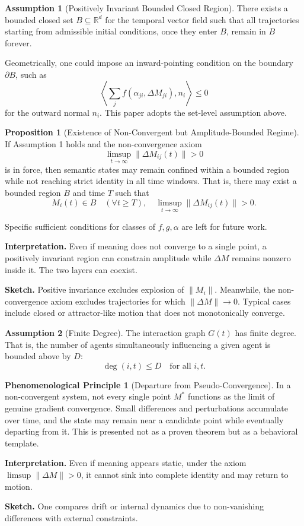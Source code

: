 \documentclass[11pt,a4paper]{article}
\theoremstyle{definition}
\newtheorem{proposition}{Proposition}[section]
\newtheorem{assumption}{Assumption}[section]
\newtheorem{phenomenological}{Phenomenological Principle}[section]
\begin{document}
\begin{assumption}[Positively Invariant Bounded Closed Region]
There exists a bounded closed set $B \subseteq \mathbb{R}^d$ for the temporal vector field such that all trajectories starting from admissible initial conditions, once they enter $B$, remain in $B$ forever.

Geometrically, one could impose an inward-pointing condition on the boundary $\partial B$, such as
\[
\left\langle \sum_j f(\alpha_{ji}, \Delta M_{ji}), n_i \right\rangle \leq 0
\]
for the outward normal $n_i$. This paper adopts the set-level assumption above.
\end{assumption}

\begin{proposition}[Existence of Non-Convergent but Amplitude-Bounded Regime]
If Assumption 1 holds and the non-convergence axiom
\[
\limsup_{t \to \infty} \|\Delta M_{ij}(t)\| > 0
\]
is in force, then semantic states may remain confined within a bounded region while not reaching strict identity in all time windows. That is, there may exist a bounded region $B$ and time $T$ such that
\[
M_i(t) \in B \quad (\forall t \geq T), \quad \limsup_{t \to \infty} \|\Delta M_{ij}(t)\| > 0.
\]

Specific sufficient conditions for classes of $f, g, \alpha$ are left for future work.
\end{proposition}

\textbf{Interpretation.} Even if meaning does not converge to a single point, a positively invariant region can constrain amplitude while $\Delta M$ remains nonzero inside it. The two layers can coexist.

\textbf{Sketch.} Positive invariance excludes explosion of $\|M_i\|$. Meanwhile, the non-convergence axiom excludes trajectories for which $\|\Delta M\| \to 0$. Typical cases include closed or attractor-like motion that does not monotonically converge.

\begin{assumption}[Finite Degree]
The interaction graph $G(t)$ has finite degree. That is, the number of agents simultaneously influencing a given agent is bounded above by $D$:
\[
\deg(i,t) \leq D \quad \text{for all } i, t.
\]
\end{assumption}

\begin{phenomenological}[Departure from Pseudo-Convergence]
In a non-convergent system, not every single point $M^*$ functions as the limit of genuine gradient convergence. Small differences and perturbations accumulate over time, and the state may remain near a candidate point while eventually departing from it. This is presented not as a proven theorem but as a behavioral template.

\textbf{Interpretation.} Even if meaning appears static, under the axiom $\limsup \|\Delta M\| > 0$, it cannot sink into complete identity and may return to motion.

\textbf{Sketch.} One compares drift or internal dynamics due to non-vanishing differences with external constraints.
\end{phenomenological}
\end{document}
